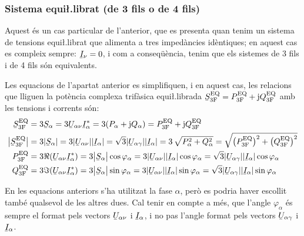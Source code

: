 \subsubsection{Sistema equi{\l.l}ibrat (de 3 fils o de 4 fils)}

Aquest \'{e}s un cas particular de l'anterior, que es presenta quan
tenim un sistema de tensions equi{\l.l}ibrat que alimenta a tres
imped\`{a}ncies id\`{e}ntiques; en aquest cas es compleix sempre:
$\cmplx{I}_\nu=0$, i com a conseq\"{u}\`{e}ncia, tenim que els sistemes de 3
fils i de 4 fils s\'{o}n equivalents.

Les equacions de l'apartat anterior es simplifiquen, i en aquest
cas, les relacions que lliguen la  pot\`{e}ncia complexa trif\`{a}sica
equi{\l.l}ibrada $\cmplx{S}\ped{3F}\ap{EQ} = P\ped{3F}\ap{EQ} + \ju
Q\ped{3F}\ap{EQ}$ amb les tensions i corrents s\'{o}n:
\begin{align}
    \cmplx{S}\ped{3F}\ap{EQ} &= 3\cmplx{S}_\alpha = 3\cmplx{U}_{\alpha\nu} \cmplx{I}_\alpha^* =
    3 (P_\alpha + \ju Q_\alpha) = P\ped{3F}\ap{EQ} +\ju Q\ped{3F}\ap{EQ} \label{eq:s_3f_eq}\\
    \big|\cmplx{S}\ped{3F}\ap{EQ}\big| &= 3|\cmplx{S}_\alpha | =   3 |\cmplx{U}_{\alpha\nu}| |\cmplx{I}_\alpha| =
    \sqrt{3} |\cmplx{U}_{\alpha\gamma}| |\cmplx{I}_\alpha| = 3\,\sqrt{P_\alpha^2 + Q_\alpha^2} =
    \sqrt{\big(P\ped{3F}\ap{EQ}\big)^2 + \big(Q\ped{3F}\ap{EQ}\big)^2} \\
    P\ped{3F}\ap{EQ} &= 3\Re(\cmplx{U}_{\alpha\nu} \cmplx{I}_\alpha^*) =
    3\big|\cmplx{S}_\alpha\big| \cos \varphi_\alpha = 3 |\cmplx{U}_{\alpha\nu}|
    |\cmplx{I}_\alpha|\label{eq:p_3f_34}
    \cos \varphi_\alpha = \sqrt{3} |\cmplx{U}_{\alpha\gamma}||\cmplx{I}_\alpha| \cos \varphi_\alpha \\
    Q\ped{3F}\ap{EQ} &= 3\Im(\cmplx{U}_{\alpha\nu} \cmplx{I}_\alpha^*) =
    3\big|\cmplx{S}_\alpha\big|  \sin \varphi_\alpha = 3 |\cmplx{U}_{\alpha\nu}| |\cmplx{I}_\alpha|\label{eq:q_3f_34}
    \sin\varphi_\alpha=\sqrt{3} |\cmplx{U}_{\alpha\gamma}||\cmplx{I}_\alpha|\sin \varphi_\alpha
\end{align}

En les equacions anteriors s'ha utilitzat la fase $\alpha$, per\`{o} es
podria haver escollit tamb\'{e} qualsevol de les altres dues. Cal tenir
en compte a m\'{e}s, que l'angle $\varphi_\alpha$ \'{e}s sempre el format
pels vectors $\cmplx{U}_{\alpha\nu}$ i $\cmplx{I}_\alpha$, i no pas
l'angle format pels vectors $\cmplx{U}_{\alpha\gamma}$ i
$\cmplx{I}_\alpha$.


